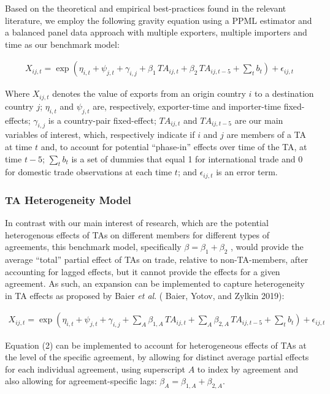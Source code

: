 \documentclass[12pt]{article}%
\begin{document}
%
Based on the theoretical and empirical best-practices found in the
relevant literature, we employ the following gravity equation using a
PPML estimator and a balanced panel data approach with multiple
exporters, multiple importers and time as our benchmark model:

\begin{multline}
    X_{ij,t} = \exp\left(\eta_{i,t} + \psi_{j,t} + \gamma_{i,j} + \beta_{1} \, TA_{ij,t} \right. + \beta_{2} \, TA_{ij,t-5} + \left. \sum_{t} b_{t} \right) + \epsilon_{ij,t}
\end{multline}

Where \(X_{ij,t}\) denotes the value of exports from an origin country
\(i\) to a destination country \(j\); \(\eta_{i,t}\) and \(\psi_{j,t}\)
are, respectively, exporter-time and importer-time fixed-effects;
\(\gamma_{i,j}\) is a country-pair fixed-effect;
\({TA}_{ij,t}\) and \({TA}_{ij,t - 5}\) are our main variables of
interest, which, respectively indicate if \(i\) and \(j\) are members of
a TA at time \(t\) and, to account for potential ``phase-in'' effects
over time of the TA, at time \(t - 5\); \(\sum_{t}^{}b_{t}\) is a set of
dummies that equal 1 for international trade and 0 for domestic trade
observations at each time \(t\); and \(\epsilon_{ij,t}\) is an error
term.%
\subsubsection{TA Heterogeneity Model}%
\label{ssubsec:TAHeterogeneityModel}%

%
In contrast with our main interest of research, which are the potential
heterogenous effects of TAs on different members for different types of
agreements, this benchmark model, specifically
\(\beta = \beta_{1} + \beta_{2}\) , would provide the average ``total''
partial effect of TAs on trade, relative to non-TA-members, after accounting for lagged effects, but
it cannot provide the effects for a given agreement. As such, an
expansion can be implemented to capture heterogeneity in TA effects as
proposed by Baier \emph{et al}. (\cite{baier_widely_2019} Baier, Yotov, and Zylkin 2019):

\begin{multline}
    X_{ij,t} = \exp\left(\eta_{i,t} + \psi_{j,t} + \gamma_{i,j} + \sum_{A} \beta_{1,A} \, TA_{ij,t} \right. + \sum_{A} \beta_{2,A} \, TA_{ij,t-5} + \left. \sum_{t} b_{t} \right) + \epsilon_{ij,t}
\end{multline}

Equation (2) can be implemented to account for heterogeneous effects of
TAs at the level of the specific agreement, by allowing for distinct
average partial effects for each individual agreement, using superscript
\(A\) to index by agreement and also allowing for agreement-specific
lags: \(\beta_{A} = \beta_{1,A} + \beta_{2,A}\).%
\end{document}
